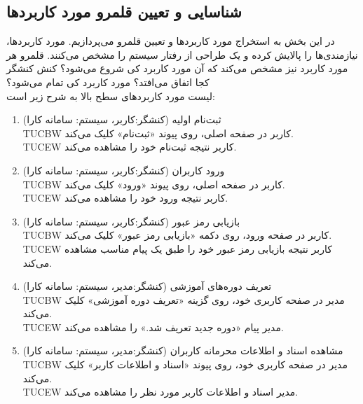 \documentclass[12pt]{article}
\begin{document}
	\subsection{شناسایی و تعیین قلمرو مورد کاربردها}
	در این بخش به استخراج مورد کاربردها و تعیین قلمرو می‌پردازیم. مورد کاربردها، نیازمندی‌ها را پالایش کرده و یک طراحی از رفتار سیستم را مشخص می‌کنند. قلمرو هر مورد کاربرد نیز مشخص می‌کند که آن مورد کاربرد کی شروع می‌شود؟ کنش کنشگر کجا اتفاق می‌افتد؟ مورد کاربرد کی تمام می‌شود؟\\
	لیست مورد کاربردهای سطح بالا به شرح زیر است:
	\begin{enumerate}
		\item
		ثبت‌نام اولیه (کنشگر:‌کاربر، سیستم: سامانه کارا)\\
		TUCBW کاربر در صفحه اصلی، روی پیوند «ثبت‌نام» کلیک می‌کند.\\
		TUCEW کاربر نتیجه ثبت‌نام خود را مشاهده می‌کند.\\

		\item
		ورود کاربران (کنشگر:‌کاربر، سیستم: سامانه کارا)\\
		TUCBW کاربر در صفحه اصلی، روی پیوند «ورود» کلیک می‌کند. \\
		TUCEW کاربر نتیجه ورود خود را مشاهده می‌کند.\\

		\item
		بازیابی رمز عبور (کنشگر:‌کاربر، سیستم: سامانه کارا)\\
		TUCBW کاربر در صفحه ورود، روی دکمه «بازیابی رمز عبور» کلیک می‌کند.\\
		TUCEW کاربر نتیجه بازیابی رمز عبور خود را طبق یک پیام مناسب مشاهده می‌کند.\\

		\item
	تعریف دوره‌های آموزشی (کنشگر:‌مدیر، سیستم: سامانه کارا)\\
		TUCBW  مدیر در صفحه کاربری خود، روی گزینه «تعریف دوره آموزشی» کلیک می‌کند.\\
		TUCEW مدیر پیام «دوره جدید تعریف شد.» را مشاهده می‌کند.\\

		\item
		مشاهده اسناد و اطلاعات محرمانه کاربران (کنشگر:‌مدیر، سیستم: سامانه کارا)\\
		TUCBW مدیر در صفحه کاربری خود، روی پیوند «اسناد و اطلاعات کاربر» کلیک می‌کند.\\
		TUCEW مدیر اسناد و اطلاعات کاربر مورد نظر را مشاهده می‌کند.\\


\end{enumerate}
\end{document}
